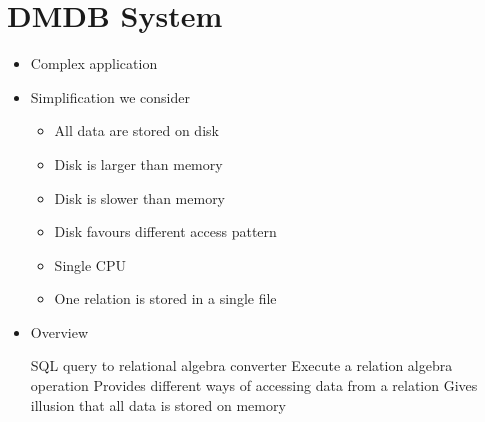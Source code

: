 
\section{DMDB System}
\begin{itemize}
    \item Complex application
    \item Simplification we consider
        \begin{itemize}
            \item All data are stored on disk
            \item Disk is larger than memory
            \item Disk is slower than memory
            \item Disk favours different access pattern
            \item Single CPU
            \item One relation is stored in a single file
        \end{itemize}
    \item Overview
        \begin{itemize}
             SQL query to relational algebra converter
             Execute a relation algebra operation
             Provides different ways of accessing data from a relation
             Gives illusion that all data is stored on memory
        \end{itemize}
\end{itemize}


